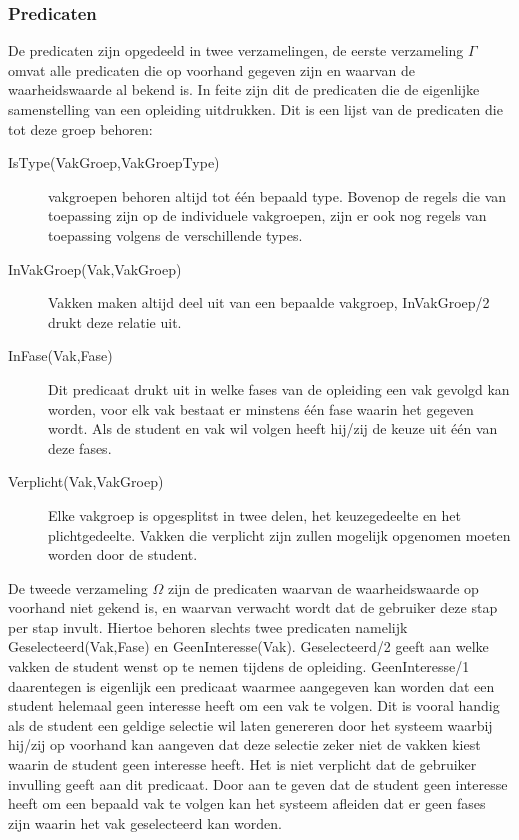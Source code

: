 \subsubsection{Predicaten}
De predicaten zijn opgedeeld in twee verzamelingen, de eerste verzameling $\Gamma$ omvat alle predicaten die op voorhand gegeven zijn en waarvan de waarheidswaarde al bekend is. In feite zijn dit de predicaten die de eigenlijke samenstelling van een opleiding uitdrukken. Dit is een lijst van de predicaten die tot deze groep behoren:
\begin{description}
\item [IsType(VakGroep,VakGroepType)] vakgroepen behoren altijd tot \'{e}\'{e}n bepaald type. Bovenop de regels die van toepassing zijn op de individuele vakgroepen, zijn er ook nog regels van toepassing volgens de verschillende types.
\item [InVakGroep(Vak,VakGroep)] Vakken maken altijd deel uit van een bepaalde vakgroep, InVakGroep/2 drukt deze relatie uit. 
\item [InFase(Vak,Fase)] Dit predicaat drukt uit in welke fases van de opleiding een vak gevolgd kan worden, voor elk vak bestaat er minstens \'{e}\'{e}n fase waarin het gegeven wordt. Als de student en vak wil volgen heeft hij/zij de keuze uit \'{e}\'{e}n van deze fases.
\item [Verplicht(Vak,VakGroep)] Elke vakgroep is opgesplitst in twee delen, het keuzegedeelte en het plichtgedeelte. Vakken die verplicht zijn zullen mogelijk opgenomen moeten worden door de student.
\end{description}

De tweede verzameling $\Omega$ zijn de predicaten waarvan de waarheidswaarde op voorhand niet gekend is, en waarvan verwacht wordt dat de gebruiker deze stap per stap invult. Hiertoe behoren slechts twee predicaten namelijk Geselecteerd(Vak,Fase) en GeenInteresse(Vak). Geselecteerd/2 geeft aan welke vakken de student wenst op te nemen tijdens de opleiding. GeenInteresse/1 daarentegen is eigenlijk een predicaat waarmee aangegeven kan worden dat een student helemaal geen interesse heeft om een vak te volgen. Dit is vooral handig als de student een geldige selectie wil laten genereren door het systeem waarbij hij/zij op voorhand kan aangeven dat deze selectie zeker niet de vakken kiest waarin de student geen interesse heeft. Het is niet verplicht dat de gebruiker invulling geeft aan dit predicaat. Door aan te geven dat de student geen interesse heeft om een bepaald vak te volgen kan het systeem afleiden dat er geen fases zijn waarin het vak geselecteerd kan worden.

